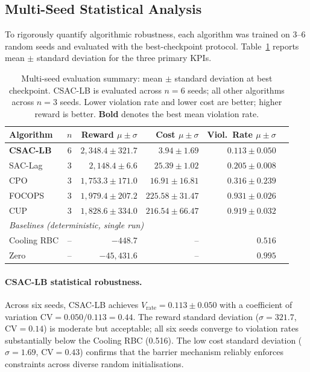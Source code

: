 \subsection{Multi-Seed Statistical Analysis}
\label{sec:temp-results-multiseed}

To rigorously quantify algorithmic robustness, each algorithm was trained on
\num{3}--\num{6} random seeds and evaluated with the best-checkpoint protocol.
Table~\ref{tab:multiseed-summary} reports mean $\pm$ standard deviation for
the three primary KPIs.

\begin{table}[htbp]
\centering
\caption{Multi-seed evaluation summary: mean $\pm$ standard deviation at
  best checkpoint.  CSAC-LB is evaluated across $n=6$ seeds; all other
  algorithms across $n=3$ seeds.  Lower violation rate and lower cost are
  better; higher reward is better.  \textbf{Bold} denotes the best mean
  violation rate.}
\label{tab:multiseed-summary}
\begin{tabular}{lcrrrr}
\toprule
\textbf{Algorithm} & $n$ &
  \textbf{Reward $\mu \pm \sigma$} &
  \textbf{Cost $\mu \pm \sigma$} &
  \textbf{Viol.\ Rate $\mu \pm \sigma$} \\
\midrule
\textbf{CSAC-LB} & 6 &
  $2{,}348.4 \pm 321.7$ &
  $3.94 \pm 1.69$ &
  $\mathbf{0.113 \pm 0.050}$ \\
SAC-Lag & 3 &
  $2{,}148.4 \pm 6.6$ &
  $25.39 \pm 1.02$ &
  $0.205 \pm 0.008$ \\
CPO & 3 &
  $1{,}753.3 \pm 171.0$ &
  $16.91 \pm 16.81$ &
  $0.316 \pm 0.239$ \\
FOCOPS & 3 &
  $1{,}979.4 \pm 207.2$ &
  $225.58 \pm 31.47$ &
  $0.931 \pm 0.026$ \\
CUP & 3 &
  $1{,}828.6 \pm 334.0$ &
  $216.54 \pm 66.47$ &
  $0.919 \pm 0.032$ \\
\midrule
\multicolumn{5}{l}{\textit{Baselines (deterministic, single run)}} \\
Cooling RBC & -- & $-448.7$ & -- & $0.516$ \\
Zero & -- & $-45{,}431.6$ & -- & $0.995$ \\
\bottomrule
\end{tabular}
\end{table}

\paragraph{CSAC-LB statistical robustness.}
Across six seeds, CSAC-LB achieves $V_{\text{rate}} = 0.113 \pm 0.050$ with
a coefficient of variation $\text{CV} = 0.050/0.113 = 0.44$.  The reward
standard deviation ($\sigma = 321.7$, $\text{CV} = 0.14$) is moderate but
acceptable; all six seeds converge to violation rates substantially below the
Cooling RBC (0.516).  The low cost standard deviation ($\sigma = 1.69$,
$\text{CV} = 0.43$) confirms that the barrier mechanism reliably enforces
constraints across diverse random initialisations.

